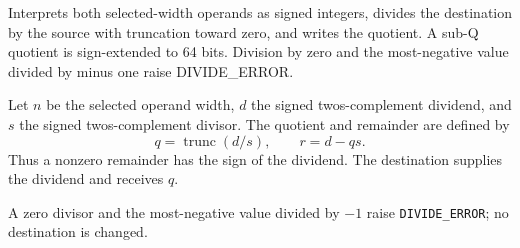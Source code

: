 Interprets both selected-width operands as signed integers, divides the destination by the source with truncation toward zero, and writes the quotient. A sub-Q quotient is sign-extended to 64 bits. Division by zero and the most-negative value divided by minus one raise DIVIDE\_ERROR.

Let \(n\) be the selected operand width, \(d\) the signed two\textquotesingle{}s-complement dividend, and \(s\) the signed two\textquotesingle{}s-complement divisor. The quotient and remainder are defined by
\[
  q = \operatorname{trunc}(d/s),
  \qquad r = d - qs .
\]
Thus a nonzero remainder has the sign of the dividend. The destination supplies the dividend and receives \(q\).

A zero divisor and the most-negative value divided by \(-1\) raise \texttt{DIVIDE\_ERROR}; no destination is changed.
